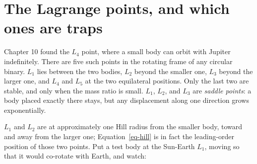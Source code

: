 \documentclass[
  10.5pt,
  letterpaper,
]{scrbook}
\theoremstyle{definition}
\theoremstyle{plain}
\theoremstyle{remark}
\begin{document}
\section{The Lagrange points, and which ones are
traps}\label{the-lagrange-points-and-which-ones-are-traps}

Chapter 10 found the \(L_4\) point, where a small body can orbit with
Jupiter indefinitely. There are five such points in the rotating frame
of any circular binary. \(L_1\) lies between the two bodies, \(L_2\)
beyond the smaller one, \(L_3\) beyond the larger one, and \(L_4\) and
\(L_5\) at the two equilateral positions. Only the last two are stable,
and only when the mass ratio is small. \(L_1\), \(L_2\), and \(L_3\) are
\emph{saddle points}: a body placed exactly there stays, but any
displacement along one direction grows exponentially.

\(L_1\) and \(L_2\) are at approximately one Hill radius from the
smaller body, toward and away from the larger one;
Equation~\ref{eq-hill} is in fact the leading-order position of those
two points. Put a test body at the Sun-Earth \(L_1\), moving so that it
would co-rotate with Earth, and watch:
\end{document}
